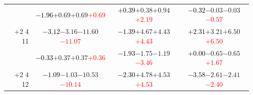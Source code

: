 \documentclass[compress]{beamer}
\begin{document}
\begin{frame}
\begin{tabular}{r | c | c | c}
          & \textcolor{black}{$-1.96$}\hspace{0.1 cm}$+0.69$\hspace{0.1 cm}$+0.69$\hspace{0.1 cm}\textcolor{red}{$+0.69$} & \textcolor{black}{$+0.39$}\hspace{0.1 cm}$+0.38$\hspace{0.1 cm}$+0.94$\hspace{0.1 cm}\textcolor{red}{$+2.19$} & \textcolor{black}{$-0.32$}\hspace{0.1 cm}$-0.03$\hspace{0.1 cm}$-0.03$\hspace{0.1 cm}\textcolor{red}{$-0.57$} \\
$+$2 4 11 & \textcolor{black}{$-3.12$}\hspace{0.1 cm}$-3.16$\hspace{0.1 cm}$-11.60$\hspace{0.1 cm}\textcolor{red}{$-11.07$} & \textcolor{black}{$-1.39$}\hspace{0.1 cm}$+4.67$\hspace{0.1 cm}$+4.43$\hspace{0.1 cm}\textcolor{red}{$+4.43$} & \textcolor{black}{$+2.31$}\hspace{0.1 cm}$+3.21$\hspace{0.1 cm}$+6.50$\hspace{0.1 cm}\textcolor{red}{$+6.50$} \\
          & \textcolor{black}{$-0.33$}\hspace{0.1 cm}$+0.37$\hspace{0.1 cm}$+0.37$\hspace{0.1 cm}\textcolor{red}{$+0.36$} & \textcolor{black}{$-1.93$}\hspace{0.1 cm}$-1.75$\hspace{0.1 cm}$-1.19$\hspace{0.1 cm}\textcolor{red}{$-3.46$} & \textcolor{black}{$+0.00$}\hspace{0.1 cm}$-0.65$\hspace{0.1 cm}$-0.65$\hspace{0.1 cm}\textcolor{red}{$+1.67$} \\
$+$2 4 12 & \textcolor{black}{$-1.09$}\hspace{0.1 cm}$-1.03$\hspace{0.1 cm}$-10.53$\hspace{0.1 cm}\textcolor{red}{$-10.14$} & \textcolor{black}{$-2.30$}\hspace{0.1 cm}$+4.78$\hspace{0.1 cm}$+4.53$\hspace{0.1 cm}\textcolor{red}{$+4.53$} & \textcolor{black}{$-3.58$}\hspace{0.1 cm}$-2.61$\hspace{0.1 cm}$-2.41$\hspace{0.1 cm}\textcolor{red}{$-2.40$} \\

\end{tabular}
\end{frame}
\end{document}
